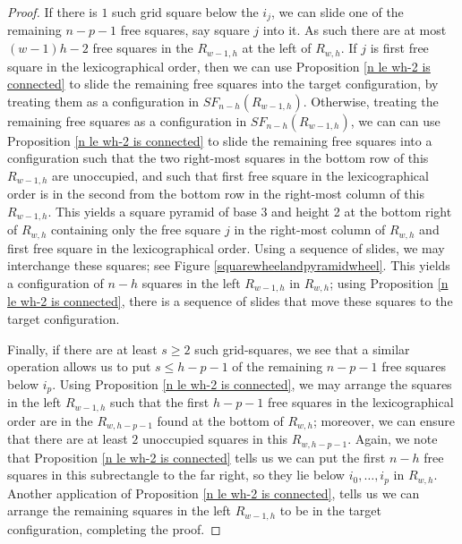 \documentclass[pagebackref,colorlinks,citecolor=blue,linkcolor=blue,urlcolor=blue,filecolor=blue]{article}
\theoremstyle{definition}\newtheorem{definition}[thm]{Definition}
\theoremstyle{definition}
\begin{document}
\begin{proof}
If there is $1$ such grid square below the $i_{j}$, we can slide one of the remaining $n-p-1$ free squares, say square $j$ into it.
As such there are at most $(w-1)h-2$ free squares in the $R_{w-1,h}$ at the left of $R_{w,h}$.
If $j$ is first free square in the lexicographical order, then we can use Proposition \ref{n le wh-2 is connected} to slide the remaining free squares into the target configuration, by treating them as a configuration in $SF_{n-h}(R_{w-1,h})$.
Otherwise, treating the remaining free squares as a configuration in $SF_{n-h}(R_{w-1,h})$, we can can use Proposition \ref{n le wh-2 is connected} to slide the remaining free squares into a configuration such that the two right-most squares in the bottom row of this $R_{w-1,h}$ are unoccupied, and such that first free square in the lexicographical order is in the second from the bottom row in the right-most column of this $R_{w-1,h}$.
This yields a square pyramid of base 3 and height 2 at the bottom right of $R_{w,h}$ containing only the free square $j$ in the right-most column of $R_{w,h}$ and first free square in the lexicographical order.
Using a sequence of slides, we may interchange these squares; see Figure \ref{squarewheelandpyramidwheel}.
This yields a configuration of $n-h$ squares in the left $R_{w-1,h}$ in $R_{w,h}$; using Proposition \ref{n le wh-2 is connected}, there is a sequence of slides that move these squares to the target configuration.

Finally, if there are at least $s\ge 2$ such grid-squares, we see that a similar operation allows us to put $s\le h-p-1$ of the remaining $n-p-1$ free squares below $i_{p}$.
Using Proposition \ref{n le wh-2 is connected}, we may arrange the squares in the left $R_{w-1,h}$ such that the first $h-p-1$ free squares in the lexicographical order are in the $R_{w,h-p-1}$ found at the bottom of $R_{w,h}$; moreover, we can ensure that there are at least $2$ unoccupied squares in this $R_{w,h-p-1}$.
Again, we note that Proposition \ref{n le wh-2 is connected} tells us we can put the first $n-h$ free squares in this subrectangle to the far right, so they lie below $i_{0}, \dots, i_{p}$ in $R_{w,h}$.
Another application of Proposition \ref{n le wh-2 is connected}, tells us we can arrange the remaining squares in the left $R_{w-1,h}$ to be in the target configuration, completing the proof.
\end{proof}
\end{document}
